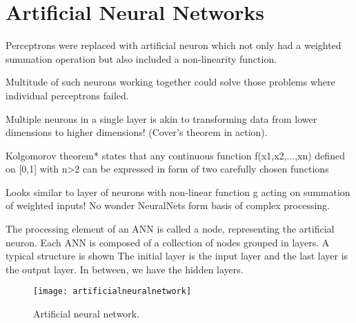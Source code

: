 	\section{Artificial Neural Networks}

	\begin{bulletedlist}
		\item Perceptrons were replaced with artificial neuron which not only had a weighted summation operation but also included a non-linearity function.
		\item Multitude of such neurons working together could solve those problems where individual perceptrons failed.
		\item Multiple neurons in a single layer is akin to transforming data from lower dimensions to higher dimensions! (Cover's theorem in action).
		\item Kolgomorov theorem* states that any continuous function f(x1,x2,...,xn) defined on [0,1] with n>2 can be expressed in form of two carefully chosen functions
		\item Looks similar to layer of neurons with non-linear function g acting on summation of weighted inputs!  No wonder NeuralNets form basis of complex processing.
		\item The processing element of an ANN is called a node, representing the artificial neuron.  Each ANN is composed of a collection of nodes grouped in layers. A typical structure is shown The initial layer is the input layer and the last layer is the output layer.  In between, we have the hidden layers.
	\end{bulletedlist}
 	\begin{figure}[htb]
		\centering
		\texttt{[image: artificialneuralnetwork]}
		\caption[Artificial neural network]{Artificial neural network.}
		\label{fig:artificialneuralnetwork}
	\end{figure}

